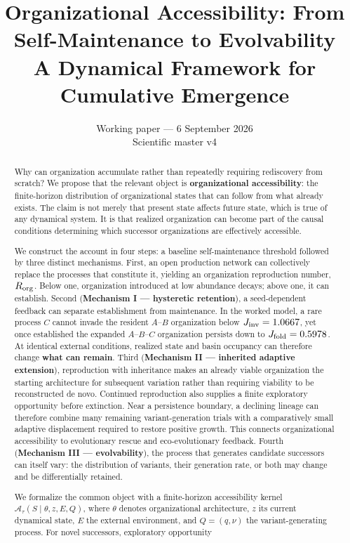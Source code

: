 \documentclass[11pt,a4paper]{article}
\title{\textbf{Organizational Accessibility: From Self-Maintenance to Evolvability}\\[0.5em]
\large A Dynamical Framework for Cumulative Emergence}
\author{}
\date{Working paper --- 6 September 2026\\\small Scientific master v4}
\begin{document}
\maketitle

\begin{abstract}
Why can organization accumulate rather than repeatedly requiring
rediscovery from scratch? We propose that the relevant object is
\textbf{organizational accessibility}: the finite-horizon distribution
of organizational states that can follow from what already exists. The
claim is not merely that present state affects future state, which is
true of any dynamical system. It is that realized organization can
become part of the causal conditions determining which successor
organizations are effectively accessible.

We construct the account in four steps: a baseline self-maintenance
threshold followed by three distinct mechanisms. First, an open
production network can collectively replace the processes that
constitute it, yielding an organization reproduction number,
\(R_{\rm org}\). Below one, organization introduced at low abundance
decays; above one, it can establish. Second (\textbf{Mechanism I ---
hysteretic retention}), a seed-dependent feedback can separate
establishment from maintenance. In the worked model, a rare process
\(C\) cannot invade the resident \(A\)--\(B\) organization below
\(J_{\rm inv}=1.0667\), yet once established the expanded
\(A\)--\(B\)--\(C\) organization persists down to
\(J_{\rm fold}=0.5978\). At identical external conditions, realized
state and basin occupancy can therefore change \textbf{what can remain}.
Third (\textbf{Mechanism II --- inherited adaptive extension}),
reproduction with inheritance makes an already viable organization the
starting architecture for subsequent variation rather than requiring
viability to be reconstructed de novo. Continued reproduction also
supplies a finite exploratory opportunity before extinction. Near a
persistence boundary, a declining lineage can therefore combine many
remaining variant-generation trials with a comparatively small adaptive
displacement required to restore positive growth. This connects
organizational accessibility to evolutionary rescue and eco-evolutionary
feedback. Fourth (\textbf{Mechanism III --- evolvability}), the process
that generates candidate successors can itself vary: the distribution of
variants, their generation rate, or both may change and be
differentially retained.

We formalize the common object with a finite-horizon accessibility
kernel \(\mathcal A_\tau(S\mid\theta,z,E,Q)\), where \(\theta\) denotes
organizational architecture, \(z\) its current dynamical state, \(E\)
the external environment, and \(Q=(q,\nu)\) the variant-generating
process. For novel successors, exploratory opportunity


\end{abstract}
\end{document}
